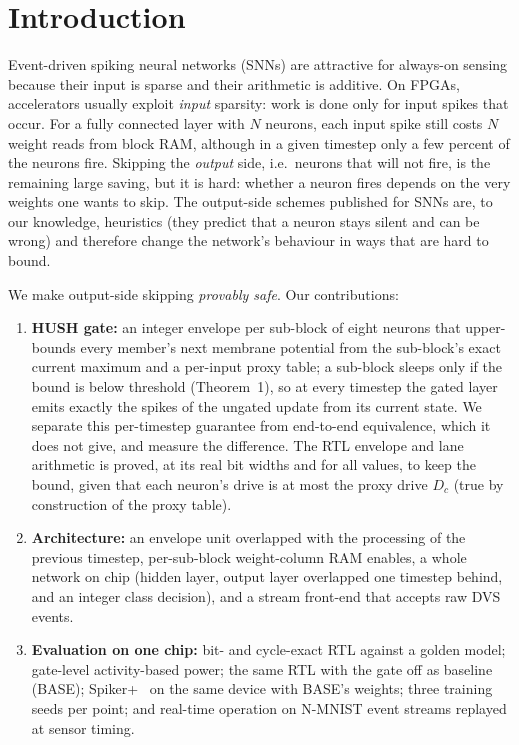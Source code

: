 \documentclass[conference]{IEEEtran}
\begin{document}
\section{Introduction}
Event-driven spiking neural networks (SNNs) are attractive for always-on sensing because their input is sparse
and their arithmetic is additive. On FPGAs, accelerators usually exploit \emph{input} sparsity: work is done only
for input spikes that occur. For a fully connected layer with $N$ neurons, each input spike still costs $N$ weight
reads from block RAM, although in a given timestep only a few percent of the neurons fire. Skipping the
\emph{output} side, i.e.\ neurons that will not fire, is the remaining large saving, but it is hard: whether a
neuron fires depends on the very weights one wants to skip. The output-side schemes published for SNNs are, to our
knowledge, heuristics (they predict that a neuron stays silent and can be wrong) and therefore change the network's
behaviour in ways that are hard to bound.

We make output-side skipping \emph{provably safe}. Our contributions:
\begin{enumerate}
\item \textbf{HUSH gate:} an integer envelope per sub-block of eight neurons that upper-bounds every member's next
membrane potential from the sub-block's exact current maximum and a per-input proxy table; a sub-block sleeps only
if the bound is below threshold (Theorem~1), so at every timestep the gated layer emits exactly the spikes of the
ungated update from its current state. We separate this per-timestep guarantee from end-to-end equivalence, which it
does not give, and measure the difference. The RTL envelope and lane arithmetic is proved, at its real bit widths
and for all values, to keep the bound, given that each neuron's drive is at most the proxy drive $D_c$ (true by
construction of the proxy table).
\item \textbf{Architecture:} an envelope unit overlapped with the processing of the previous timestep, per-sub-block
weight-column RAM enables, a whole network on chip (hidden layer, output layer overlapped one timestep behind, and an
integer class decision), and a stream front-end that accepts raw DVS events.
\item \textbf{Evaluation on one chip:} bit- and cycle-exact RTL against a golden model; gate-level activity-based
power; the same RTL with the gate off as baseline (BASE); Spiker+~\cite{spikerplus} on the same device with BASE's weights;
three training seeds per point; and real-time operation on N-MNIST event streams replayed at sensor timing.
\end{enumerate}
\end{document}
